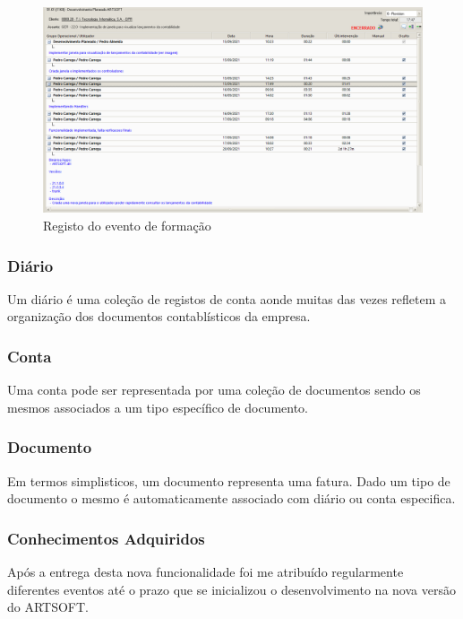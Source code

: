 \documentclass[sigplan]{acmart}
\begin{document}
\begin{figure}[htbp]
	\centerline{\includegraphics[width=\linewidth]{figures/evento_formacao.png}}
	\caption{Registo do evento de formação}
	\label{fig2}
\end{figure}

\subsubsection{Diário}

Um diário é uma coleção de registos de conta aonde muitas das vezes refletem a organização dos documentos contablísticos da empresa.

\subsubsection{Conta}

Uma conta pode ser representada por uma coleção de documentos sendo os mesmos associados a um tipo específico de documento.

\subsubsection{Documento}

Em termos simplisticos, um documento representa uma fatura. Dado um tipo de documento o mesmo é automaticamente associado com diário ou conta especifica.

\subsubsection{Conhecimentos Adquiridos}

 Após a entrega desta nova funcionalidade foi me atribuído regularmente diferentes eventos até o prazo que se inicializou o desenvolvimento na nova versão do ARTSOFT.
\end{document}
